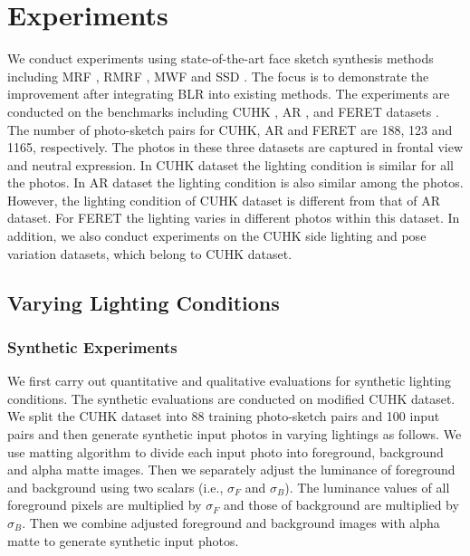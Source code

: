 \documentclass{article}
\begin{document}
\section{Experiments}\label{sec:exp}
We conduct experiments using state-of-the-art face sketch synthesis methods including MRF \cite{wang-pami2009-face}, RMRF \cite{wei-eccv10-lighting}, MWF \cite{hao-cvpr12-mwf} and SSD \cite{song-eccv14-sketch}. The focus is to demonstrate the improvement after integrating BLR into existing methods. The experiments are conducted on the benchmarks including CUHK \cite{wang-pami2009-face}, AR \cite{Mart-TR98-AR}, and FERET datasets \cite{wei-cvpr11-coupled}. The number of photo-sketch pairs for CUHK, AR and FERET are 188, 123 and 1165, respectively. The photos in these three datasets are captured in frontal view and neutral expression. In CUHK dataset the lighting condition is similar for all the photos. In AR dataset the lighting condition is also similar among the photos. However, the lighting condition of CUHK dataset is different from that of AR dataset. For FERET the lighting varies in different photos within this dataset. In addition, we also conduct experiments on the CUHK side lighting and pose variation datasets, which belong to CUHK dataset.

\subsection{Varying Lighting Conditions}\label{sec:explight}

\subsubsection{Synthetic Experiments}\label{sec:syntheticlight}

We first carry out quantitative and qualitative evaluations for synthetic lighting conditions. The synthetic evaluations are conducted on modified CUHK dataset. We split the CUHK dataset into 88 training photo-sketch pairs and 100 input pairs and then generate synthetic input photos in varying lightings as follows. We use matting algorithm \cite{levin-pami08-matting} to divide each input photo into foreground, background and alpha matte images. Then we separately adjust the luminance of foreground and background using two scalars (i.e., $\sigma_F$ and $\sigma_B$). The luminance values of all foreground pixels are multiplied by $\sigma_F$ and those of background are multiplied by $\sigma_B$. Then we combine adjusted foreground and background images with alpha matte to generate synthetic input photos.
\end{document}
